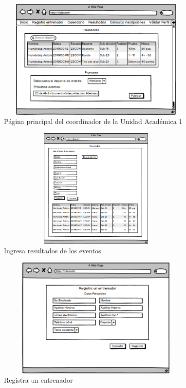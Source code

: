 		\begin{figure}[hbt!]
			\centering
			\includegraphics[width=10cm, height=6cm]{Imagenes/Disenos/p10InicioCoordUA1.png}
			\caption{Página principal del coordinador de la Unidad Académica 1}
			\label{IniciogeneralcoordUA1}
		\end{figure}
	
		\begin{figure}[hbt!]
			\centering
			\includegraphics[width=10cm, height=6cm]{Imagenes/Disenos/p11Ingresaresultados.png}
			\caption{Ingresa resultados de los eventos}
			\label{Ingresaresultados}
		\end{figure}
	
		\begin{figure}[hbt!]
			\centering
			\includegraphics[width=10cm, height=6cm]{Imagenes/Disenos/p12Registroentrenador.png}
			\caption{Registra un entrenador}
			\label{Registroentrenador}
		\end{figure}
			\pagebreak
	
